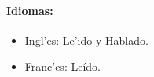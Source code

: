 \paragraph{Idiomas:}
\begin{itemize}
\item Ingl'es: Le'ido y Hablado.
\item Franc'es: Le\'{i}do.
\end{itemize}

